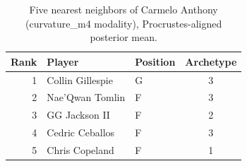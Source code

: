 \begin{table}[htbp]
  \centering\small
  \begin{tabular}{rllc}
    \toprule
    Rank & Player & Position & Archetype \\
    \midrule
    1 & Collin Gillespie & G & 3 \\
    2 & Nae'Qwan Tomlin & F & 3 \\
    3 & GG Jackson II & F & 2 \\
    4 & Cedric Ceballos & F & 3 \\
    5 & Chris Copeland & F & 1 \\
    \bottomrule
  \end{tabular}
  \caption{Five nearest neighbors of Carmelo Anthony (curvature_m4 modality), Procrustes-aligned posterior mean.}
  \label{tab:Carmelo_Anthony_neighbors_curvature_m4}
\end{table}

